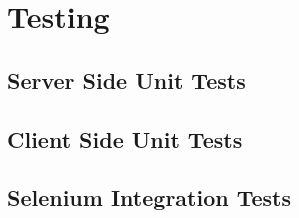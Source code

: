\chapter{Testing}

\section{Server Side Unit Tests}
\section{Client Side Unit Tests}
\section{Selenium Integration Tests}

%
%
%
%
%

